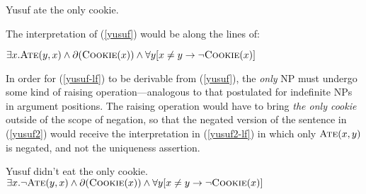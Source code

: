 \begin{exe}
	\ex \label{yusuf} Yusuf ate the only cookie.
\end{exe}

The interpretation of (\ref{yusuf}) would be along the lines of:

\begin{exe}
	\ex \label{yusuf-lf} $\exists x . \textsc{Ate}(y, x) \land \partial(\textsc{Cookie}(x)) \land \forall y [ x \ne y \to \neg \textsc{Cookie}(x) ]$
\end{exe}

In order for (\ref{yusuf-lf}) to be derivable from (\ref{yusuf}), the \textit{only} NP must undergo some kind of raising operation---analogous to that postulated for indefinite NPs in argument positions. The raising operation would have to bring \textit{the only cookie} outside of the scope of negation, so that the negated version of the sentence in (\ref{yusuf2}) would receive the interpretation in (\ref{yusuf2-lf}) in which only $\textsc{Ate}(x, y)$ is negated, and not the uniqueness assertion.

\begin{exe}
	\ex \label{yusuf2} Yusuf didn't eat the only cookie.
	\ex \label{yusuf2-lf} $\exists x . \neg\textsc{Ate}(y, x) \land \partial(\textsc{Cookie}(x)) \land \forall y [ x \ne y \to \neg \textsc{Cookie}(x) ]$
\end{exe}
